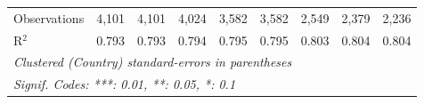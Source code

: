 \begin{tabular}{lcccccccc}
   Observations                                              & 4,101        & 4,101        & 4,024        & 3,582   & 3,582   & 2,549        & 2,379         & 2,236\\  
   R$^2$                                                     & 0.793        & 0.793        & 0.794        & 0.795   & 0.795   & 0.803        & 0.804         & 0.804\\  
   \midrule
   \multicolumn{9}{l}{\emph{Clustered (Country) standard-errors in parentheses}}\\
   \multicolumn{9}{l}{\emph{Signif. Codes: ***: 0.01, **: 0.05, *: 0.1}}\\
\end{tabular}
\par\endgroup


